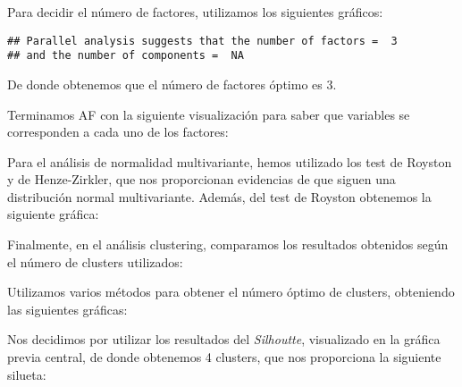 \documentclass[11pt,a4paper]{article}
\begin{document}
Para decidir el número de factores, utilizamos los siguientes gráficos:
\begin{figure}[H]
\centering
{}
\end{figure}
\begin{verbatim}
## Parallel analysis suggests that the number of factors =  3
## and the number of components =  NA
\end{verbatim}
De donde obtenemos que el número de factores óptimo es 3.

Terminamos AF con la siguiente visualización para saber que variables se corresponden a cada uno de los factores:
\begin{figure}[H]
\centering
{}
\end{figure}

Para el análisis de normalidad multivariante, hemos utilizado los test de Royston y de Henze-Zirkler, que nos proporcionan evidencias de que siguen una distribución normal multivariante. Además, del test de Royston obtenemos la siguiente gráfica:
\begin{figure}[H]
\centering
{}
\end{figure}

Finalmente, en el análisis clustering, comparamos los resultados obtenidos según el número de clusters utilizados:
\begin{figure}[H]
\centering
{}
\end{figure}

Utilizamos varios métodos para obtener el número óptimo de clusters, obteniendo las siguientes gráficas:
\begin{figure}[H]
\centering
{}
\end{figure}

Nos decidimos por utilizar los resultados del \emph{Silhoutte}, visualizado en la gráfica previa central, de donde obtenemos 4 clusters, que nos proporciona la siguiente silueta:
\begin{figure}[H]
\centering
{}
\end{figure}
\end{document}
